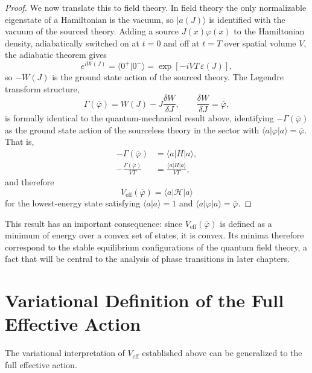 \begin{proof}
	We now translate this to field theory. In field theory the only
	normalizable eigenstate of a Hamiltonian is the vacuum, so $|a(J)\rangle$
	is identified with the vacuum of the sourced theory. Adding a source
	$J(x)\varphi(x)$ to the Hamiltonian density, adiabatically switched on
	at $t=0$ and off at $t=T$ over spatial volume $V$, the adiabatic theorem
	gives
	\begin{equation}
		e^{iW(J)} = \langle 0^+|0^-\rangle
		= \exp\left[-iVT\,\varepsilon(J)\right],
	\end{equation}
	so $-W(J)$ is the ground state action of the sourced theory. The Legendre
	transform structure,
	\begin{equation}
		\Gamma(\bar{\varphi}) = W(J) - J\frac{\delta W}{\delta J},
		\qquad \frac{\delta W}{\delta J} = \bar{\varphi},
	\end{equation}
	is formally identical to the quantum-mechanical result above, identifying
	$-\Gamma(\bar\varphi)$ as the ground state action of the sourceless
	theory in the sector with $\langle a|\varphi|a\rangle = \bar\varphi$.
	That is,
	\begin{align}
		-\Gamma(\bar{\varphi})            & = \langle a|H|a\rangle,            \\
		-\frac{\Gamma(\bar{\varphi})}{VT} & = \frac{\langle a|H|a\rangle}{VT},
	\end{align}
	and therefore
	\begin{equation}
		V_{\text{eff}}(\bar{\varphi}) = \langle a|\mathcal{H}|a\rangle
	\end{equation}
	for the lowest-energy state satisfying $\langle a|a\rangle=1$ and
	$\langle a|\varphi|a\rangle = \bar\varphi$.
\end{proof}

This result has an important consequence: since $V_{\text{eff}}(\bar\varphi)$
is defined as a minimum of energy over a convex set of states, it is
convex. Its minima therefore correspond to the stable equilibrium
configurations of the quantum field theory, a fact that will be central
to the analysis of phase transitions in later chapters.

\section{Variational Definition of the Full Effective Action}

The variational interpretation of $V_{\text{eff}}$ established above can
be generalized to the full effective action.

